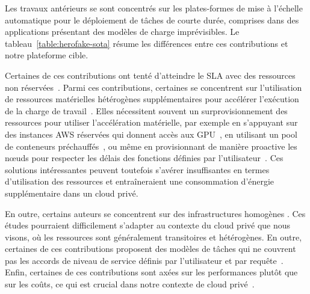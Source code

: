 Les travaux antérieurs se sont concentrés sur les plates-formes de mise à l'échelle automatique pour le déploiement de tâches de courte durée, comprises dans des applications présentant des modèles de charge imprévisibles. Le tableau~\ref{table:herofake-sota} résume les différences entre ces contributions et notre plateforme cible.

Certaines de ces contributions ont tenté d'atteindre le SLA avec des ressources non réservées~\cite{gujaratiSwayamDistributedAutoscaling2017, zhangMArkExploitingCloud, mampageDeadlineawareDynamicResource2021, singhviAtollScalableLowLatency2021, handaoui2020releaser, handaoui2020salamander, yalles2022riscless}.
Parmi ces contributions, certaines se concentrent sur l'utilisation de ressources matérielles hétérogènes supplémentaires pour accélérer l'exécution de la charge de travail~\cite{zhangMArkExploitingCloud, lingPigeonDynamicEfficient2019, yangINFlessNativeServerless2022}.
Elles nécessitent souvent un surprovisionnement des ressources pour utiliser l'accélération matérielle, par exemple en s'appuyant sur des instances AWS réservées qui donnent accès aux GPU~\cite{zhangMArkExploitingCloud}, en utilisant un pool de conteneurs préchauffés~\cite{lingPigeonDynamicEfficient2019}, ou même en provisionnant de manière proactive les nœuds pour respecter les délais des fonctions définies par l'utilisateur~\cite{singhviAtollScalableLowLatency2021}. Ces solutions intéressantes peuvent toutefois s'avérer insuffisantes en termes d'utilisation des ressources et entraîneraient une consommation d'énergie supplémentaire dans un cloud privé.

En outre, certains auteurs se concentrent sur des infrastructures homogènes \cite{gujaratiSwayamDistributedAutoscaling2017, sureshENSUREEfficientScheduling2020, mampageDeadlineawareDynamicResource2021, singhviAtollScalableLowLatency2021, yangINFlessNativeServerless2022}. Ces études pourraient difficilement s'adapter au contexte du cloud privé que nous visons, où les ressources sont généralement transitoires et hétérogènes. En outre, certaines de ces contributions proposent des modèles de tâches qui ne couvrent pas les accords de niveau de service définis par l'utilisateur et par requête~\cite{sureshENSUREEfficientScheduling2020, lingPigeonDynamicEfficient2019}. Enfin, certaines de ces contributions sont axées sur les performances plutôt que sur les coûts, ce qui est crucial dans notre contexte de cloud privé~\cite{gujaratiSwayamDistributedAutoscaling2017, lingPigeonDynamicEfficient2019, singhviAtollScalableLowLatency2021, choSLADrivenMLInference}.

